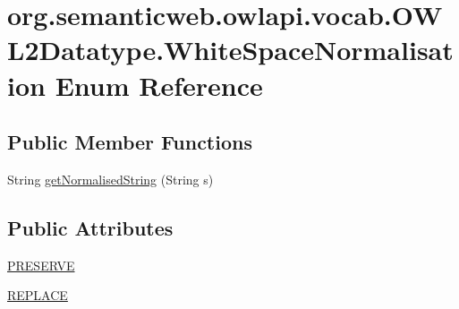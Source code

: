 \hypertarget{enumorg_1_1semanticweb_1_1owlapi_1_1vocab_1_1_o_w_l2_datatype_1_1_white_space_normalisation}{\section{org.\-semanticweb.\-owlapi.\-vocab.\-O\-W\-L2\-Datatype.\-White\-Space\-Normalisation Enum Reference}
\label{enumorg_1_1semanticweb_1_1owlapi_1_1vocab_1_1_o_w_l2_datatype_1_1_white_space_normalisation}
}
\subsection*{Public Member Functions}
\begin{DoxyCompactItemize}
\item 
String \hyperlink{enumorg_1_1semanticweb_1_1owlapi_1_1vocab_1_1_o_w_l2_datatype_1_1_white_space_normalisation_a4121955ed236cb9dd564648a40071b84}{get\-Normalised\-String} (String s)
\end{DoxyCompactItemize}
\subsection*{Public Attributes}
\begin{DoxyCompactItemize}
\item 
\hyperlink{enumorg_1_1semanticweb_1_1owlapi_1_1vocab_1_1_o_w_l2_datatype_1_1_white_space_normalisation_abbace752dad14a0f75ae60a120b5b83f}{P\-R\-E\-S\-E\-R\-V\-E}
\item 
\hyperlink{enumorg_1_1semanticweb_1_1owlapi_1_1vocab_1_1_o_w_l2_datatype_1_1_white_space_normalisation_ad670006678747d8130829a55dbcf022d}{R\-E\-P\-L\-A\-C\-E}
\end{DoxyCompactItemize}


